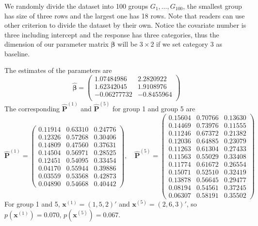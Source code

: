 \documentclass[12pt]{article}
\newcommand{\betavec}{{\boldsymbol{\beta}}}
\newcommand{\Pmat}{\mathbf{P}}
\newcommand{\wh}{\widehat}
\newcommand{\xvec}{\boldsymbol{x}}
\begin{document}
We randomly divide the dataset into 100 groups $G_1,\dots,G_{100}$, the smallest group has size of three rows and the largest one has 18 rows. Note that readers can use other criterion to divide the dataset by their own. Notice the covariate number is three including intercept and the response has three categories, thus the dimension of our parameter matrix $\betavec$ will be $3 \times 2$ if we set category 3 as baseline.

The estimates of the parameters are
\begin{equation*}
\wh{\betavec} =
\begin{pmatrix}
 1.07484986 & 2.2820922 \\
 1.62342045 & 1.9108976 \\
 -0.06277732 &-0.8455964\\
\end{pmatrix}
\end{equation*}
The corresponding $\wh{\Pmat}^{(1)}$ and $\wh{\Pmat}^{(5)}$ for group 1 and group 5 are
\begin{equation*}
    \wh{\Pmat}^{(1)} = \begin{pmatrix}

 0.11914 & 0.63310 & 0.24776\\
 0.12326 & 0.57268 & 0.30406\\
 0.14809 & 0.47560 & 0.37631\\
 0.14504 & 0.56971 & 0.28525\\
 0.12451 & 0.54095 & 0.33454\\
 0.04170 & 0.55944 & 0.39886\\
 0.03559 & 0.53568 & 0.42873\\
 0.04890 & 0.54668 & 0.40442
    \end{pmatrix}, \quad
    \wh{\Pmat}^{(5)} = \begin{pmatrix}
 0.15604 & 0.70766 & 0.13630\\
 0.14469 & 0.73976 & 0.11555\\
 0.11246 & 0.67372 & 0.21382\\
 0.12036 & 0.64885 & 0.23079\\
 0.11263 & 0.61304 & 0.27433\\
 0.11563 & 0.55029 & 0.33408\\
 0.11774 & 0.61672 & 0.26554\\
 0.15071 & 0.52510 & 0.32419\\
 0.13878 & 0.56645 & 0.29477\\
 0.08194 & 0.54561 & 0.37245\\
 0.06307 & 0.58191 & 0.35502
    \end{pmatrix}
\end{equation*}
For group 1 and 5, $\xvec^{(1)} = (1,5,2)'$ and $\xvec^{(5)} = (2,6,3)'$, so $p(\xvec^{(1)}) = 0.070$, $p(\xvec^{(5)}) = 0.067$.
\end{document}
